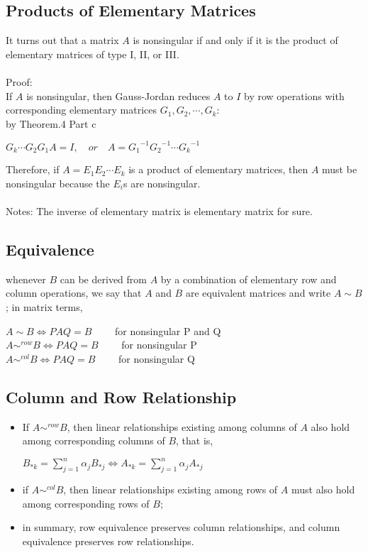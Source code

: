 \documentclass[UTF8,a4paper,11pt]{amsbook}
\begin{document}
\subsection{Products of Elementary Matrices}
It turns out that a matrix $A$ is nonsingular if and only if it is the product of elementary matrices of type I, II, or III.
\\ \\
Proof:\\
If $A$ is nonsingular, then Gauss-Jordan reduces $A$ to $I$ by row operations with corresponding elementary matrices $G_1, G_2, \cdots , G_k$:\\
by Theorem.4 Part c
\begin{center}
$G_k\cdots G_2G_1A=I,\quad or \quad A={G_1}^{-1}{G_2}^{-1}\cdots {G_k}^{-1}$
\end{center}
Therefore, if $A = E_1E_2 \cdots E_k$ is a product of elementary matrices,
then $A$ must be nonsingular because the $E_i$s are nonsingular.\\ \\
Notes: The inverse of elementary matrix is elementary matrix for sure.
\subsection{Equivalence}
whenever $B$ can be derived from $A$ by a combination of elementary row and column operations, we say that $A$ and $B$ are equivalent matrices and write $A \sim B$; in matrix terms,
\begin{center}
$A \sim B \iff PAQ=B \qquad$ for nonsingular P and Q\\
$A \sim ^{row} B \iff PAQ=B \qquad$ for nonsingular P\\
$A \sim ^{col} B \iff PAQ=B \qquad$ for nonsingular Q
\end{center}
\subsection{Column and Row Relationship}
\begin{itemize}
\item If $A \sim ^{row} B$, then linear relationships existing among columns of $A$ also hold among corresponding columns of $B$, that is,
\begin{center}
$B_{*k}=\displaystyle\sum_{j=1}^{n}\alpha_{j}B_{*j} \iff A_{*k}=\displaystyle\sum_{j=1}^{n}\alpha_{j}A_{*j}$
\end{center}
\item if $A \sim ^{col} B$, then linear relationships existing among rows of $A$ must
also hold among corresponding rows of $B$;
\item in summary, row equivalence preserves column relationships, and column equivalence preserves row relationships.
\end{itemize}
\end{document}
